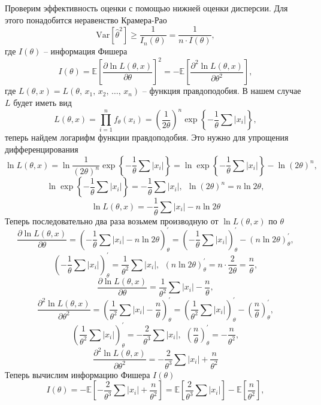 \documentclass[a4paper, 12pt]{article}
\begin{document}
    Проверим эффективность оценки с помощью нижней оценки дисперсии. Для этого понадобится неравенство Крамера-Рао
    $$\text{Var}{\left[\hat{\theta}^2\right]}\geq\dfrac{1}{I_n(\theta)}=\dfrac{1}{n\cdot I(\theta)},$$
    где $I(\theta)$ -- информация Фишера
    $$I(\theta)=\mathbb{E}\left[\dfrac{\partial\ln{L\left(\theta,x\right)}}{\partial\theta}\right]^2=-\mathbb{E}\left[\dfrac{\partial^2\ln{L\left(\theta,x\right)}}{\partial\theta^2}\right],$$
    где $L\left(\theta,x\right)=L\left(\theta,\,x_1,\,x_2,\,\hdots,\,x_n\right)$ -- функция правдоподобия. В нашем случае $L$ будет иметь вид
    $$L\left(\theta,x\right)=\prod_{i=1}^nf_{\theta}\left(x_i\right)=\left(\dfrac{1}{2\theta}\right)^n\exp{\left\{-\dfrac{1}{\theta}\sum{|x_i|}\right\}},$$
    теперь найдем логарифм функции правдоподобия. Это нужно для упрощения дифференцирования
    $$\ln{L\left(\theta,x\right)}=\ln{\dfrac{1}{\left(2\theta\right)^n}}\exp{\left\{-\dfrac{1}{\theta}\sum{|x_i|}\right\}}=\ln{\exp{\left\{-\dfrac{1}{\theta}\sum{|x_i|}\right\}}}-\ln{\left(2\theta\right)^n},$$
    $$\ln{\exp{\left\{-\dfrac{1}{\theta}\sum{|x_i|}\right\}}}=-\dfrac{1}{\theta}\sum{|x_i|},\ \ \ln{\left(2\theta\right)^n}=n\ln{2\theta},$$
    $$\ln{L\left(\theta,x\right)}=-\dfrac{1}{\theta}\sum{|x_i|}-n\ln{2\theta}$$
    Теперь последовательно два раза возьмем производную от $\ln{L\left(\theta,x\right)}$ по $\theta$
    $$\dfrac{\partial\ln{L\left(\theta,x\right)}}{\partial\theta}=\left(-\dfrac{1}{\theta}\sum{|x_i|}-n\ln{2\theta}\right)^{\prime}_{\theta}=
    \left(-\dfrac{1}{\theta}\sum{|x_i|}\right)^{\prime}_{\theta}-\left(n\ln{2\theta}\right)^{\prime}_{\theta},$$
    $$\left(-\dfrac{1}{\theta}\sum{|x_i|}\right)^{\prime}_{\theta}=\dfrac{1}{\theta^2}\sum{|x_i|}, \ \ \left(n\ln{2\theta}\right)^{\prime}_{\theta}=n\cdot\dfrac{2}{2\theta}=\dfrac{n}{\theta},$$
    $$\dfrac{\partial\ln{L\left(\theta,x\right)}}{\partial\theta}=\dfrac{1}{\theta^2}\sum{|x_i|}-\dfrac{n}{\theta},$$
    $$\dfrac{\partial^2\ln{L\left(\theta,x\right)}}{\partial\theta^2}=\left(\dfrac{1}{\theta^2}\sum{|x_i|}-\dfrac{n}{\theta}\right)^{\prime}_{\theta}=
    \left(\dfrac{1}{\theta^2}\sum{|x_i|}\right)^{\prime}_{\theta}-\left(\dfrac{n}{\theta}\right)^{\prime}_{\theta},$$
    $$\left(\dfrac{1}{\theta^2}\sum{|x_i|}\right)^{\prime}_{\theta}=-\dfrac{2}{\theta^3}\sum{|x_i|}, \ \ \left(\dfrac{n}{\theta}\right)^{\prime}_{\theta}=-\dfrac{n}{\theta^2},$$
    $$\dfrac{\partial^2\ln{L\left(\theta,x\right)}}{\partial\theta^2}=-\dfrac{2}{\theta^3}\sum{|x_i|}+\dfrac{n}{\theta^2}$$
    Теперь вычислим информацию Фишера $I\left(\theta\right)$
    $$I\left(\theta\right)=-\mathbb{E}\left[-\dfrac{2}{\theta^3}\sum{|x_i|}+\dfrac{n}{\theta^2}\right]=\mathbb{E}\left[\dfrac{2}{\theta^3}\sum{|x_i|}\right]-\mathbb{E}\left[\dfrac{n}{\theta^2}\right],$$
\end{document}
